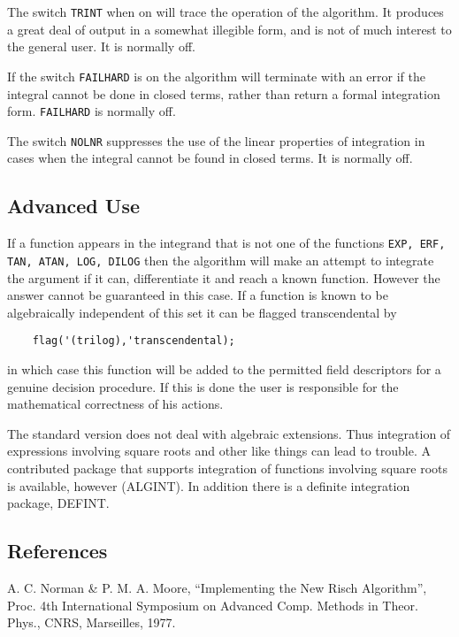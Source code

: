 The switch {\tt TRINT} when on will trace the operation of the algorithm. It
produces a great deal of output in a somewhat illegible form, and is not
of much interest to the general user. It is normally off.

If the switch {\tt FAILHARD} is on the algorithm will terminate with an
error if the integral cannot be done in closed terms, rather than return a
formal integration form. {\tt FAILHARD} is normally off.

The switch {\tt NOLNR} suppresses the use of the linear properties of
integration in cases when the integral cannot be found in closed terms.
It is normally off.

\subsection{Advanced Use}
\hypertarget{operator:ERF}{}

If a function appears in the integrand that is not one of the functions
{\tt EXP, ERF, TAN, ATAN, LOG, DILOG}
then the algorithm will make an
attempt to integrate the argument if it can, differentiate it and reach a
known function.  However the answer cannot be guaranteed in this case.  If
a function is known to be algebraically independent of this set it can be
flagged transcendental by
\begin{verbatim}
	flag('(trilog),'transcendental);
\end{verbatim}
in which case this function will be added to the permitted field
descriptors for a genuine decision procedure. If this is done the user is
responsible for the mathematical correctness of his actions.

The standard version does not deal with algebraic extensions. Thus
integration of expressions involving square roots and other like things
can lead to trouble.  A contributed package that supports integration of
functions involving square roots is available, however
(ALGINT).
In addition there is a definite integration
package, DEFINT.

\subsection{References}

	A. C. Norman \& P. M. A. Moore, ``Implementing the New Risch
		Algorithm'', Proc. 4th International Symposium on Advanced
		Comp. Methods in Theor. Phys., CNRS, Marseilles, 1977.

